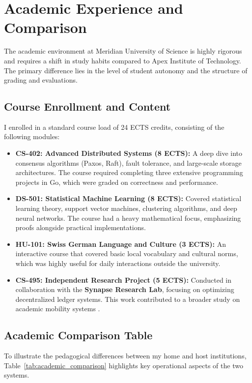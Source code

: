 \section{Academic Experience and Comparison}
\label{sec:academic_experience}

The academic environment at Meridian University of Science is highly rigorous and requires a shift in study habits compared to Apex Institute of Technology. The primary difference lies in the level of student autonomy and the structure of grading and evaluations.

\subsection{Course Enrollment and Content}
I enrolled in a standard course load of 24 ECTS credits, consisting of the following modules:
\begin{itemize}
  \item \textbf{CS-402: Advanced Distributed Systems (8 ECTS):} A deep dive into consensus algorithms (Paxos, Raft), fault tolerance, and large-scale storage architectures. The course required completing three extensive programming projects in Go, which were graded on correctness and performance.
  \item \textbf{DS-501: Statistical Machine Learning (8 ECTS):} Covered statistical learning theory, support vector machines, clustering algorithms, and deep neural networks. The course had a heavy mathematical focus, emphasizing proofs alongside practical implementations.
  \item \textbf{HU-101: Swiss German Language and Culture (3 ECTS):} An interactive course that covered basic local vocabulary and cultural norms, which was highly useful for daily interactions outside the university.
  \item \textbf{CS-495: Independent Research Project (5 ECTS):} Conducted in collaboration with the \textbf{Synapse Research Lab}, focusing on optimizing decentralized ledger systems. This work contributed to a broader study on academic mobility systems \cite{mercer2025systems}.
\end{itemize}

\subsection{Academic Comparison Table}
To illustrate the pedagogical differences between my home and host institutions, Table~\ref{tab:academic_comparison} highlights key operational aspects of the two systems.

